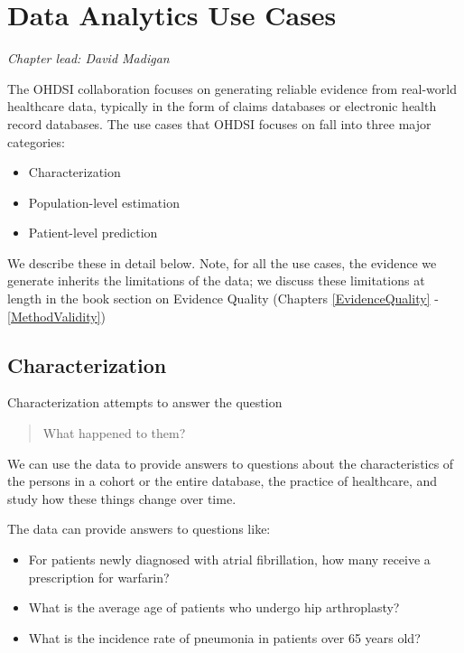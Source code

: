 \documentclass[11pt]{book}
\providecommand{\tightlist}{%
  \setlength{\itemsep}{0pt}\setlength{\parskip}{0pt}}
\theoremstyle{definition}
\theoremstyle{definition}
\theoremstyle{definition}
\theoremstyle{remark}
\begin{document}
\hypertarget{DataAnalyticsUseCases}{%
\chapter{Data Analytics Use Cases}\label{DataAnalyticsUseCases}}

\emph{Chapter lead: David Madigan}

The OHDSI collaboration focuses on generating reliable evidence from real-world healthcare data, typically in the form of claims databases or electronic health record databases. The use cases that OHDSI focuses on fall into three major categories:

\begin{itemize}
\tightlist
\item
  Characterization
\item
  Population-level estimation
\item
  Patient-level prediction
\end{itemize}

We describe these in detail below. Note, for all the use cases, the evidence we generate inherits the limitations of the data; we discuss these limitations at length in the book section on Evidence Quality (Chapters \ref{EvidenceQuality} - \ref{MethodValidity})

\hypertarget{characterization}{%
\section{Characterization}\label{characterization}}

Characterization attempts to answer the question

\begin{quote}
What happened to them?
\end{quote}

We can use the data to provide answers to questions about the characteristics of the persons in a cohort or the entire database, the practice of healthcare, and study how these things change over time.

The data can provide answers to questions like:

\begin{itemize}
\tightlist
\item
  For patients newly diagnosed with atrial fibrillation, how many receive a prescription for warfarin?
\item
  What is the average age of patients who undergo hip arthroplasty?
\item
  What is the incidence rate of pneumonia in patients over 65 years old?
\end{itemize}
\end{document}
